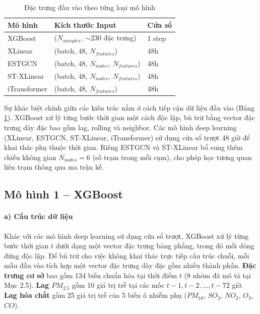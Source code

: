 \begin{table}[H]
    \centering
    \caption{Đặc trưng đầu vào theo từng loại mô hình}
    \label{tab:dac_trung_dau_vao}
    \renewcommand{\arraystretch}{1.3}
    \begin{tabular}{p{3cm} p{8cm} p{2.5cm}}
    \toprule
    \textbf{Mô hình} & \textbf{Kích thước Input} & \textbf{Cửa sổ} \\
    \midrule
    XGBoost & ($N_{samples}$, $\sim$230 đặc trưng) & 1 step \\
    XLinear & (batch, 48, $N_{features}$) & 48h \\
    ESTGCN & (batch, 48, $N_{nodes}$, $N_{features}$) & 48h \\
    ST-XLinear & (batch, 48, $N_{nodes}$, $N_{features}$) & 48h \\
    iTransformer & (batch, 48, $N_{features}$) & 48h \\
    \bottomrule
    \end{tabular}
\end{table}


Sự khác biệt chính giữa các kiến trúc nằm ở cách tiếp cận dữ liệu đầu vào (Bảng \ref{tab:dac_trung_dau_vao}). XGBoost xử lý từng bước thời gian một cách độc lập, bù trừ bằng vector đặc trưng dày đặc bao gồm lag, rolling và neighbor. Các mô hình deep learning (XLinear, ESTGCN, ST-XLinear, iTransformer) sử dụng cửa sổ trượt 48 giờ để khai thác phụ thuộc thời gian. Riêng ESTGCN và ST-XLinear bổ sung thêm chiều không gian $N_{nodes} = 6$ (số trạm trong mỗi cụm), cho phép học tương quan liên trạm thông qua ma trận kề.


\subsection{Mô hình 1 -- XGBoost}

\paragraph{a) Cấu trúc dữ liệu}
Khác với các mô hình deep learning sử dụng cửa sổ trượt, XGBoost xử lý từng bước thời gian $t$ dưới dạng một vector đặc trưng bảng phẳng, trong đó mỗi dòng đứng độc lập. Để bù trừ cho việc không khai thác trực tiếp cấu trúc chuỗi, mỗi mẫu đầu vào tích hợp một vector đặc trưng dày đặc gồm nhiều thành phần. \textbf{Đặc trưng cơ sở} bao gồm 134 biến chuẩn hóa tại thời điểm $t$ (8 nhóm đã mô tả tại Mục 2.5). \textbf{Lag $PM_{2.5}$} gồm 10 giá trị trễ tại các mốc $t-1, t-2, \ldots, t-72$ giờ. \textbf{Lag hóa chất} gồm 25 giá trị trễ của 5 biến ô nhiễm phụ ($PM_{10}$, $SO_2$, $NO_2$, $O_3$, $CO$).

